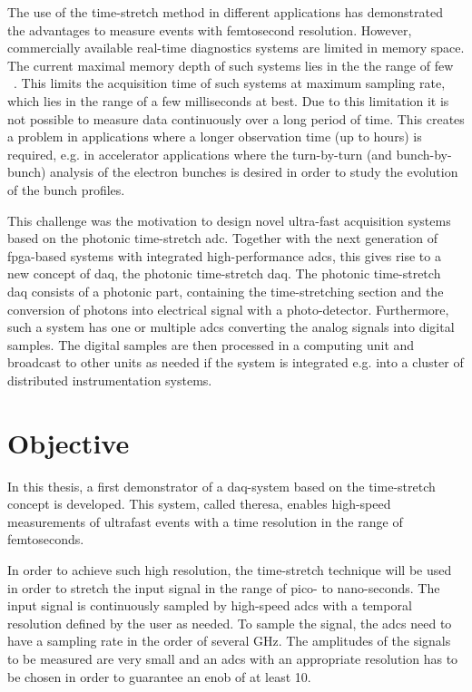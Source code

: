 The use of the time-stretch method in different applications has demonstrated the advantages to measure events with femtosecond resolution.
However, commercially available real-time diagnostics systems are limited in memory space. 
The current maximal memory depth of such systems lies in the the range of few \si{\giga \sample}.
This limits the acquisition time of such systems at maximum sampling rate, which lies in the range of a few milliseconds at best.
Due to this limitation it is not possible to measure data continuously over a long period of time. 
This creates a problem in applications where a longer observation time (up to hours) is required, e.g. in accelerator applications where the turn-by-turn (and bunch-by-bunch) analysis of the electron bunches is desired in order to study the evolution of the bunch profiles. 

This challenge was the motivation to design novel ultra-fast acquisition systems based on the photonic time-stretch \gls{adc}. 
Together with the next generation of \gls{fpga}-based systems with integrated high-performance \glspl{adc}, this gives rise to a new concept of \gls{daq}, the photonic time-stretch \gls{daq}.
The photonic time-stretch \gls{daq} consists of a photonic part, containing the time-stretching section and the conversion of photons into electrical signal with a photo-detector. 
Furthermore, such a system has one or multiple \glspl{adc} converting the analog signals into digital samples.
The digital samples are then processed in a computing unit and broadcast to other units as needed if the system is integrated e.g. into a cluster of distributed instrumentation systems. 
 

\section{Objective}
In this thesis, a first demonstrator of a \gls{daq}-system based on the time-stretch concept is developed.
This system, called \gls{theresa}, enables high-speed measurements of ultrafast events with a time resolution in the range of femtoseconds.

In order to achieve such high resolution, the time-stretch technique will be used in order to stretch the input signal in the range of pico- to nano-seconds.
The input signal is continuously sampled by high-speed \glspl{adc} with a temporal resolution defined by the user as needed.
To sample the signal, the \glspl{adc} need to have a sampling rate in the order of several \si{\GHz}.
The amplitudes of the signals to be measured are very small and an \glspl{adc} with an appropriate resolution has to be chosen in order to guarantee an \gls{enob} of at least \SI{10}{\bits}. \cite{bielwaski}

